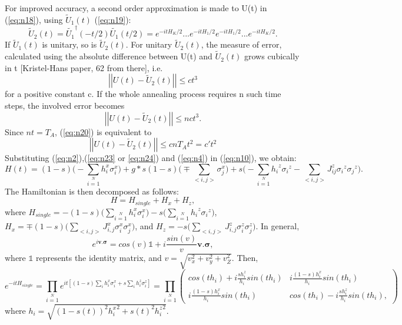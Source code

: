 \documentclass[12]{article}
\begin{document}
For improved accuracy, a second order approximation is made to U(t) in (\ref{eq:n18}), using $\tilde{U}_1(t)$ (\ref{eq:n19}):
\begin{equation}
\tilde{U}_2(t)=\tilde{U_1}^{\dagger}(-t/2)\tilde{U_1}(t/2)=e^{-itH_K/2}...e^{-itH_1/2}e^{-itH_1/2}...e^{-itH_K/2}.
\end{equation}
If $\tilde{U}_1(t)$ is unitary, so is $\tilde{U}_2(t)$. For unitary $\tilde{U}_2(t)$, the measure of error, calculated using the absolute difference between U(t) and $\tilde{U}_2(t)$ grows cubically in t [Kristel-Hans paper, 62 from there], i.e.
\begin{equation}
\left| \left| U(t)-\tilde{U}_2(t) \right| \right| \leq ct^3    
\end{equation} 
for a positive constant c. If the whole annealing process requires n such time steps, the involved error becomes
\begin{equation}
\left| \left| U(t)-\tilde{U}_2(t) \right| \right| \leq nct^3.  \label{eq:n20}
\end{equation}
Since $nt=T_A$, (\ref{eq:n20}) is equivalent to
\begin{equation}
\left| \left| U(t)-\tilde{U}_2(t) \right| \right| \leq cnT_At^2 = c't^2 \label{eq:n21}
\end{equation}
Substituting (\ref{eq:n2}),(\ref{eq:n23} or \ref{eq:n24}) and (\ref{eq:n4}) in (\ref{eq:n10}), we obtain:
\begin{equation}
H(t)=(1-s)\Big(-\sum \limits_{i=1}\limits^N h_i^x \sigma_i^x \Big)+g*s(1-s)\Big(\mp \sum \limits_{<i,j>}\sigma_{j}^x\Big) +s \Big(-\sum\limits_{i=1}\limits^{N}{h_i}^z{\sigma_i}^z - \sum\limits_{<i,j>}{J_{ij}^z} {\sigma_i}^z{\sigma_j}^z \Big).  \label{eq:n25}
\end{equation}
The Hamiltonian is then decomposed as follows:
\begin{equation}
H=H_{single}+H_x+H_z, \label{eq:n26}
\end{equation}
where $H_{single}=-(1-s)\Big(\sum \limits_{i=1}\limits^N h_i^x \sigma_i^x \Big)-s\Big(\sum\limits_{i=1}\limits^{N}{h_i}^z{\sigma_i}^z \Big)$, $H_x= \mp (1-s) \Big( \sum \limits_{<i,j>} J_{i,j}^x \sigma_{i}^x \sigma_{j}^x \Big)$, and $H_z= -s \Big(\sum \limits_{<i,j>} J_{i,j}^z \sigma_{i}^z\sigma_{j}^z\Big )$. In general, 
\begin{equation}
e^{i \mathbf{v.\sigma}}=cos(v) \mathbb{1} +i \frac{sin(v)}{v}\mathbf{v.\sigma},
\end{equation}
where $\mathbb{1}$ represents the identity matrix, and $v=\sqrt{v_x^2 +v_y^2 +v_Z^2}$. Then, 
\begin{equation}
e^{-itH_{single}}=\prod \limits_{i=1} \limits^{N} e^{it[(1-s)\sum \limits_i h_i^x \sigma_i^x +s \sum \limits_{i} h_i^z \sigma_i^z]} = \prod \limits_{i=1} \limits^{N} \begin{pmatrix}
cos(th_i) +i \frac{sh_i^z}{h_i} sin(th_i) &  i \frac{(1-s)h_i^x}{h_i} sin(th_i)\\
i \frac{(1-s)h_i^x}{h_i}sin(th_i) & cos(th_i) -i \frac{sh_i^z}{h_i} sin(th_i),
\end{pmatrix}
\end{equation}
where $h_i=\sqrt{(1-s(t))^2 {h_i^x}^2 + s(t)^2 {h_i^z}^2}$.\\
\end{document}
